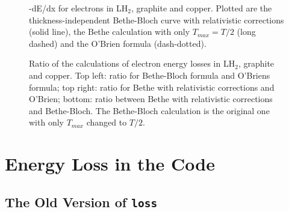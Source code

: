 \begin{figure}
\hspace{0.0in}
\epsfxsize=5.0in
\epsfysize=6.0in
\caption{-dE/dx for electrons in LH$_2$, graphite and copper. Plotted are the 
thickness-independent Bethe-Bloch curve with relativistic corrections (solid line), the 
Bethe calculation with only $T_{max}=T/2$ (long dashed) and the O'Brien formula 
(dash-dotted).}
\label{fig:electronloss}
\end{figure}

\begin{figure}
\hspace{0.0in}
\epsfxsize=5.0in
\epsfysize=6.0in
\caption{Ratio of the calculations of electron energy losses in LH$_2$, graphite and
copper. Top left: ratio for Bethe-Bloch formula and O'Briens formula; top right: ratio for
Bethe with relativistic corrections and O'Brien; bottom: ratio between Bethe with
relativistic corrections and Bethe-Bloch. The Bethe-Bloch calculation is the original
one with only $T_{max}$ changed to $T/2$.}
\label{fig:electronrelloss}
\end{figure}

\newpage

\appendix

\section{Energy Loss in the Code}
\label{section:elossinthecode}

\subsection{The Old Version of {\tt loss}}
\hspace*{\parindent}


